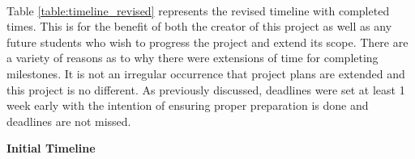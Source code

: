 \paragraph{}
Table \ref{table:timeline_revised} represents the revised timeline with completed times. This is for the benefit of both the creator of this project as well as any future students who wish to progress the project and extend its scope. There are a variety of reasons as to why there were extensions of time for completing milestones. It is not an irregular occurrence that project plans are extended and this project is no different. As previously discussed, deadlines were set at least 1 week early with the intention of ensuring proper preparation is done and deadlines are not missed.     

\newpage
\textbf{Initial Timeline}

